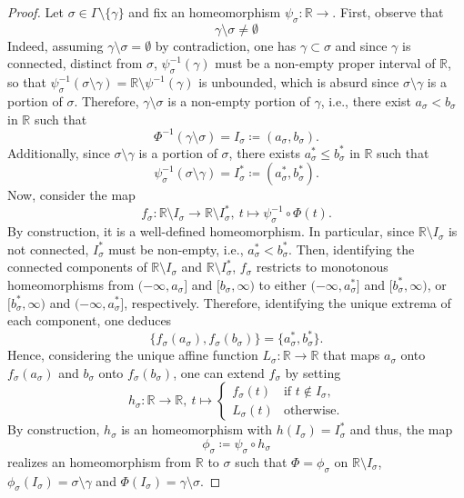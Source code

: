 \documentclass[a4paper, 11pt]{article} %
\theoremstyle{plain}
\newcommand{\R}{\mathbb{R}}
\newcommand{\1}{\mathds 1}
\numberwithin{equation}{section}
\begin{document}
\begin{proof}
    Let $\sigma\in\Gamma\setminus\{\gamma\}$ and fix an homeomorphism $\psi_\sigma:\R\to$. First, observe that 
        \[\gamma\setminus\sigma\neq\emptyset\]
    Indeed, assuming $\gamma\setminus\sigma=\emptyset$ by contradiction, one has $\gamma\subset\sigma$ and since $\gamma$ is connected, distinct from $\sigma$, $\psi_\sigma^{-1}(\gamma)$ must be a non-empty proper interval of $\R$, so that $\psi_\sigma^{-1}(\sigma\setminus\gamma)=\R\setminus\psi^{-1}(\gamma)$ is unbounded, which is absurd since $\sigma\setminus\gamma$ is a portion of $\sigma$. Therefore, $\gamma\setminus\sigma$ is a non-empty portion of $\gamma$, i.e., there exist $a_{\sigma}<b_{\sigma}$ in $\R$ such that
        \[\Phi^{-1}(\gamma\setminus\sigma)=I_{\sigma}\coloneqq(a_{\sigma},b_{\sigma}).\]
    Additionally, since $\sigma\setminus\gamma$ is a portion of $\sigma$, there exists $a_\sigma^*\leq b_{\sigma}^*$ in $\R$ such that
        \[\psi_{\sigma}^{-1}(\sigma\setminus\gamma)= I_{\sigma}^*\coloneq( a_{\sigma}^*, b_{\sigma}^*).\]
    Now, consider the map
        \[f_\sigma:\R\setminus I_{\sigma}\to\R\setminus I_\sigma^*,~t\mapsto\psi_{\sigma}^{-1}\circ\Phi(t).\]
    By construction, it is a well-defined homeomorphism. In particular, since $\R\setminus I_\sigma$ is not connected, $I_\sigma^*$ must be non-empty, i.e., $a_\sigma^*<b_\sigma^*$. Then, identifying the connected components of $\R\setminus I_\sigma$ and $\R\setminus I_\sigma^*$, $f_\sigma$ restricts to monotonous homeomorphisms from $(-\infty,a_\sigma]$ and $[b_\sigma,\infty)$ to either $(-\infty,a_\sigma^*]$ and $[b_\sigma^*,\infty)$, or $[b_\sigma^*,\infty)$ and $(-\infty,a_\sigma^*]$, respectively. Therefore, identifying the unique extrema of each component, one deduces
        \[\{f_\sigma(a_\sigma),f_\sigma(b_\sigma)\}=\{a_\sigma^*,b_\sigma^*\}.\]
    Hence, considering the unique affine function $L_\sigma:\R\to\R$ that maps $a_\sigma$ onto $f_\sigma(a_\sigma)$ and $b_\sigma$ onto $f_\sigma(b_\sigma)$, one can extend $f_\sigma$ by setting
        \[h_\sigma:\R\to\R,~t\mapsto\begin{cases}
            f_\sigma(t)&\text{if $t\notin I_\sigma$,}\\
            L_\sigma(t)&\text{otherwise}.
        \end{cases}\]
    By construction, $h_\sigma$ is an homeomorphism with $h(I_\sigma)=I_\sigma^*$ and thus, the map
        \[\phi_{\sigma}\coloneqq\psi_\sigma\circ h_\sigma\]
    realizes an homeomorphism from $\R$ to $\sigma$ such that $\Phi=\phi_\sigma$ on $\R\setminus I_\sigma$, $\phi_\sigma(I_\sigma)=\sigma\setminus\gamma$ and $\Phi(I_\sigma)=\gamma\setminus\sigma$.
    

\end{proof}
\end{document}
